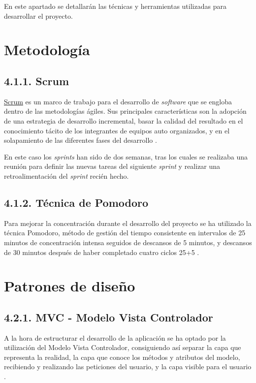 
En este apartado se detallarán las técnicas y herramientas utilizadas para desarrollar el proyecto.

\section{Metodología}

\subsection{4.1.1. Scrum}

\href{https://proyectosagiles.org/que-es-scrum/}{Scrum} es un marco de trabajo para el desarrollo de \textit{software} que se engloba dentro de las metodologías ágiles. Sus principales características son la adopción de una estrategia de desarrollo incremental, basar la calidad del resultado en el conocimiento tácito de los integrantes de equipos auto organizados, y en el solapamiento de las diferentes fases del desarrollo \cite{web:scrum}.

En este caso los \textit{sprints} han sido de dos semanas, tras los cuales se realizaba una reunión para definir las nuevas tareas del siguiente \textit{sprint} y realizar una retroalimentación del \textit{sprint} recién hecho.

\subsection{4.1.2. Técnica de Pomodoro}

Para mejorar la concentración durante el desarrollo del proyecto se ha utilizado la técnica Pomodoro, método de gestión del tiempo consistente en intervalos de 25 minutos de concentración intensa seguidos de descansos de 5 minutos, y descansos de 30 minutos después de haber completado cuatro ciclos 25+5 \cite{web:pomodoro}.

\section{Patrones de diseño}

\subsection{4.2.1. MVC - Modelo Vista Controlador}

A la hora de estructurar el desarrollo de la aplicación se ha optado por la utilización del Modelo Vista Controlador, consiguiendo así separar la capa que representa la realidad, la capa que conoce los métodos y atributos del modelo, recibiendo y realizando las peticiones del usuario, y la capa visible para el usuario \cite{web:patronDis}.

